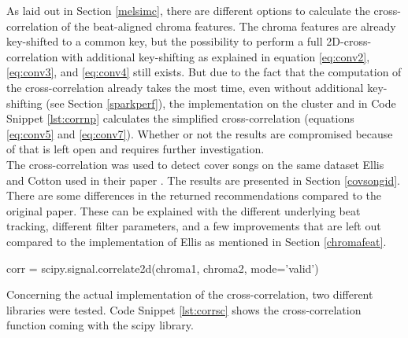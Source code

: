 As laid out in Section \ref{melsimc}, there are different options to calculate the cross-correlation of the beat-aligned chroma features. The chroma features are already key-shifted to a common key, but the possibility to perform a full 2D-cross-correlation with additional key-shifting as explained in equation \ref{eq:conv2}, \ref{eq:conv3}, and \ref{eq:conv4} still exists. But due to the fact that the computation of the cross-correlation already takes the most time, even without additional key-shifting (see Section \ref{sparkperf}), the implementation on the cluster and in Code Snippet \ref{lst:corrnp} calculates the simplified cross-correlation (equations \ref{eq:conv5} and \ref{eq:conv7}). Whether or not the results are compromised because of that is left open and requires further investigation.\\
\noindent The cross-correlation was used to detect cover songs on the same dataset Ellis and Cotton used in their paper \cite{cover802}. The results are presented in Section \ref{covsongid}. There are some differences in the returned recommendations compared to the original paper. These can be explained with the different underlying beat tracking, different filter parameters, and a few improvements that are left out compared to the implementation of Ellis \cite{cover802} as mentioned in Section \ref{chromafeat}.\\

\begin{pythonCode}[frame=single,label={lst:corrsc},caption={Cross-correlation scipy},captionpos=b]
corr = scipy.signal.correlate2d(chroma1, chroma2, mode='valid')
\end{pythonCode}

\noindent Concerning the actual implementation of the cross-correlation, two different libraries were tested. Code Snippet \ref{lst:corrsc} shows the cross-correlation function coming with the scipy library.

